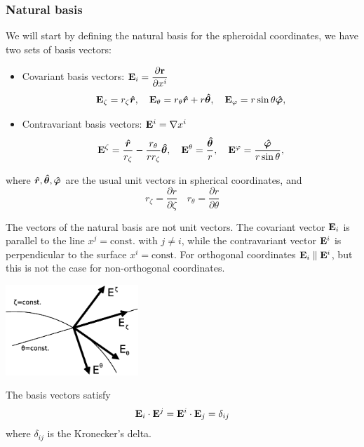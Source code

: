 \subsubsection{Natural basis}

We will start by defining the natural basis for the spheroidal coordinates, we have two sets of basis vectors:
\begin{itemize}
\item Covariant basis vectors: $\displaystyle\mathbf{E}_i=\frac{\partial\mathbf{r}}
{\partial x^i}$
\begin{equation}
\mathbf{E}_\zeta=r_\zeta\boldsymbol{\hat r}, \quad
\mathbf{E}_\theta=r_\theta\boldsymbol{\hat r}+r\boldsymbol{\hat \theta}, \quad
\mathbf{E}_\varphi=r\sin\theta\boldsymbol{\hat \varphi},
\end{equation}
\item Contravariant basis vectors: $\mathbf{E}^i=\nabla x^i$
\begin{equation}
\mathbf{E}^\zeta=\frac{\boldsymbol{\hat r}}{r_\zeta}-\frac{r_\theta}{rr_\zeta}\boldsymbol{\hat \theta}, \quad
\mathbf{E}^\theta=\frac{\boldsymbol{\hat \theta}}{r},\quad
\mathbf{E}^{\varphi}=\frac{\boldsymbol{\hat \varphi}}{r\sin\theta},
\end{equation}
\end{itemize}
\noindent where $\boldsymbol{\hat r},\boldsymbol{\hat \theta},\boldsymbol{\hat \varphi}$ are the usual unit vectors in spherical coordinates, and
$$r_\zeta=\frac{\partial r}{\partial\zeta}\quad r_\theta=\frac{\partial r}{\partial\theta}$$

The vectors of the natural basis are not unit vectors. The covariant vector $\mathbf{E}_i$ is parallel to 
the line $x^j=\mathrm{const.}$ with $j\ne i$, while the contravariant vector $\mathbf{E}^i$ is 
perpendicular to the surface $x^i=\mathrm{const.}$ For orthogonal coordinates $\mathbf{E}_i\parallel\mathbf{E}^i$, but
this is not the case for non-orthogonal coordinates.

\begin{center}
\includegraphics[width=5cm]{fig/vectors.eps}
\end{center}

The basis vectors satisfy
\begin{equation}
\mathbf{E}_i\cdot\mathbf{E}^j=\mathbf{E}^i\cdot\mathbf{E}_j=\delta_{ij}
\end{equation}
where $\delta_{ij}$ is the Kronecker's delta.

